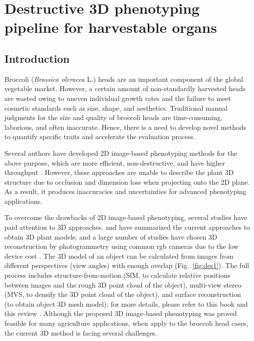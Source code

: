 \chapter{Destructive 3D phenotyping pipeline for harvestable organs}

\section{Introduction}


Broccoli (\textit{Brassica oleracea} L.) heads are an important component of the global vegetable market. However, a certain amount of non-standardly harvested heads are wasted owing to uneven individual growth rates and the failure to meet cosmetic standards such as size, shape, and aesthetics. Traditional manual judgments for the size and quality of broccoli heads are time-consuming, laborious, and often inaccurate. Hence, there is a need to develop novel methods to quantify specific traits and accelerate the evaluation process.

Several authors have developed 2D image-based phenotyping methods for the above purpose, which are more efficient, non-destructive, and have higher throughput \citep{yang_greenness_2015,guo_easypcc_2017,zou_broccoli_2019}. However, these approaches are unable to describe the plant 3D structure due to occlusion and dimension loss when projecting onto the 2D plane. As a result, it produces inaccuracies and uncertainties for advanced phenotyping applications.

To overcome the drawbacks of 2D image-based phenotyping, several studies have paid attention to 3D approaches. \citet{paulus_measuring_2019} and \citet{kochi_introduction_2021} have summarized the current approaches to obtain 3D plant models; and a large number of studies have chosen 3D reconstruction by photogrammetry using common \gls{rgb} cameras due to the low device cost \citep{xiao_estimating_2021,zermas_3d_2020,zhang_estimating_2016}. The 3D model of an object can be calculated from images from different perspectives (view angles) with enough overlap (Fig.~\ref{fig:des1}). The full process includes structure-from-motion (SfM, to calculate relative positions between images and the rough 3D point cloud of the object), multi-view stereo (MVS, to densify the 3D point cloud of the object), and surface reconstruction (to obtain object 3D mesh model); for more details, please refer to this book \citep{hartley_multiple_2000} and this review \citep{snavely_scene_2010}. Although the proposed 3D image-based phenotyping was proved feasible for many agriculture applications, when apply to the broccoli head cases, the current 3D method is facing several challenges.

